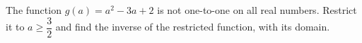 The function $g(a)=a^2-3a+2$ is not one-to-one on all real numbers. Restrict it to $a\ge\dfrac32$ and find the inverse of the restricted function, with its domain.
